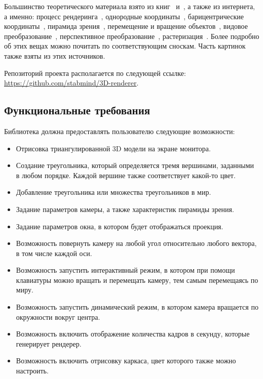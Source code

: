 \documentclass{article}
\begin{document}
Большинство теоретического материала взято из книг~\cite{Graph3D} и~\cite{Math3d}, а также из интернета, а именно: процесс рендеринга~\cite[Chapter~1]{Math3d}, однородные координаты~\cite[Chapter~4.4]{Math3d}, барицентрические координаты~\cite[Chapter~IV.1.3]{Graph3D}, пирамида зрения~\cite[Chapter~5.3]{Math3d}, перемещение и вращение объектов~\cite[Chapter~4.3]{Math3d}, видовое преобразование~\cite{Camera}, перспективное преобразование~\cite[Chapter~5.5.1]{Math3d}, растеризация~\cite[Chapter~II.4]{Graph3D}.
Более подробно об этих вещах можно почитать по соответствующим сноскам.
Часть картинок также взяты из этих источников.

Репозиторий проекта располагается по следующей ссылке: \url{https://github.com/stabmind/3D-renderer}.

\subsection{Функциональные требования}

Библиотека должна предоставлять пользователю следующие возможности:

\begin{itemize}
	\item Отрисовка триангулированной 3D модели на экране монитора.
	\item Создание треугольника, который определяется тремя вершинами, заданными в любом порядке.
	Каждой вершине также соответствует какой-то цвет.
	\item Добавление треугольника или множества треугольников в мир.
	\item Задание параметров камеры, а также характеристик пирамиды зрения.
	\item Задание параметров окна, в котором будет отображаться проекция.
	\item Возможность повернуть камеру на любой угол относительно любого вектора, в том числе каждой оси.
	\item Возможность запустить интерактивный режим, в котором при помощи клавиатуры можно вращать и перемещать камеру, тем самым перемещаясь по миру.
	\item Возможность запустить динамический режим, в котором камера вращается по окружности вокруг центра.
	\item Возможность включить отображение количества кадров в секунду, которые генерирует рендерер.
	\item Возможность включить отрисовку каркаса, цвет которого также можно настроить.
\end{itemize}
\end{document}
